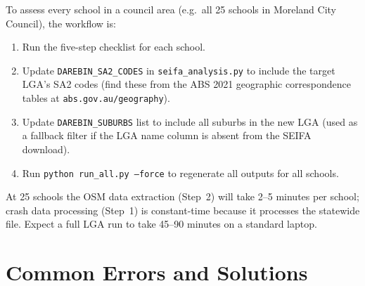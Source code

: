 \documentclass[11pt,a4paper,openany]{book}
\begin{document}
To assess every school in a council area (e.g.\ all 25 schools in Moreland City
Council), the workflow is:

\begin{enumerate}
  \item Run the five-step checklist for each school.
  \item Update \texttt{DAREBIN\_SA2\_CODES} in \texttt{seifa\_analysis.py} to include
    the target LGA's SA2 codes (find these from the ABS 2021 geographic correspondence
    tables at \texttt{abs.gov.au/geography}).
  \item Update \texttt{DAREBIN\_SUBURBS} list to include all suburbs in the new LGA
    (used as a fallback filter if the LGA name column is absent from the SEIFA download).
  \item Run \texttt{python run\_all.py --force} to regenerate all outputs for all schools.
\end{enumerate}

At 25 schools the OSM data extraction (Step~2) will take 2--5 minutes per school;
crash data processing (Step~1) is constant-time because it processes the statewide
file.  Expect a full LGA run to take 45--90 minutes on a standard laptop.

\section{Common Errors and Solutions}
\end{document}

